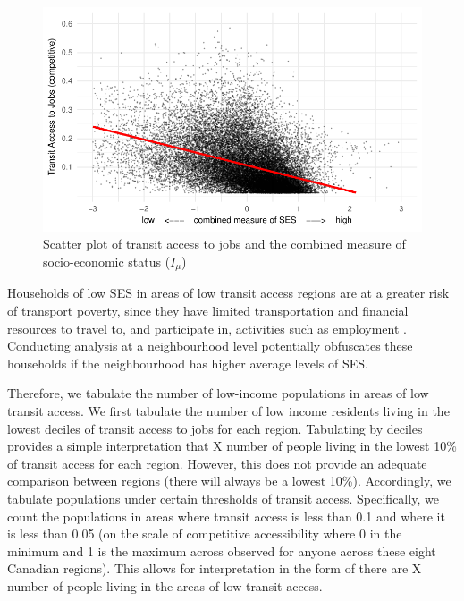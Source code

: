 \documentclass[11 pt, letterpaper]{article}
\begin{document}
{\begin{figure}[H]
	\vspace{2mm}
	\caption{Scatter plot of transit access to jobs and the combined measure of socio-economic status ($I_\mu$)}
	\label{AiT_Mu}
	\centerline{\includegraphics[width=5.5in]{figures/income_plots/AiT_Mmu.pdf}}
	\vspace{2mm}
\end{figure}

Households of low SES in areas of low transit access regions are at a greater risk of transport poverty, since they have limited transportation and financial resources to travel to, and participate in, activities such as employment \cite{preston2007,lucas2012}. Conducting analysis at a neighbourhood level potentially obfuscates these households if the neighbourhood has higher average levels of SES. 

Therefore, we tabulate the number of low-income populations in areas of low transit access. We first tabulate the number of low income residents living in the lowest deciles of transit access to jobs for each region. Tabulating by deciles provides a simple interpretation that X number of people living in the lowest 10\% of transit access for each region. However, this does not provide an adequate comparison between regions (there will always be a lowest 10\%). Accordingly, we tabulate populations under certain thresholds of transit access. Specifically, we count the populations in areas where transit access is less than 0.1 and where it is less than 0.05 (on the scale of competitive accessibility where 0 in the minimum and 1 is the maximum across observed for anyone across these eight Canadian regions). This allows for interpretation in the form of there are X number of people living in the areas of low transit access. 

}
\end{document}
